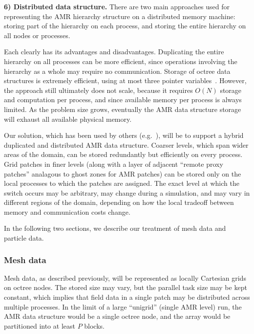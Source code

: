 \documentclass[10pt,twocolumn]{article}
\begin{document}

\textbf{6) Distributed data structure.} There are two main approaches
used for representing the AMR hierarchy structure on a distributed
memory machine: storing part of the hierarchy on each process, and
storing the entire hierarchy on all nodes or processes.

Each clearly has its advantages and disadvantages.  Duplicating the
entire hierarchy on all processes can be more efficient, since
operations involving the hierarchy as a whole may require no
communication.  Storage of octree data structures is extremely
efficient, using at most three pointer variables~\cite{FrPe02}.  However,
the approach still ultimately does not scale, because it requires
$O(N)$ storage and computation per process, and since available memory
per process is always limited.  As the problem size grows, eventually
the AMR data structure storage will exhaust all available physical
memory.

Our solution, which has been used by others
(e.g.~\cite{@@@hybrid-storage}), will be to support a hybrid
duplicated and distributed AMR data structure.  Coarser levels, which
span wider areas of the domain, can be stored redundantly but
efficiently on every process.  Grid patches in finer levels (along
with a layer of adjacent ``remote proxy patches'' analagous to ghost
zones for AMR patches) can be stored only on the local processes to
which the patches are assigned.  The exact level at which the switch
occurs may be arbitrary, may change during a simulation, and may vary
in different regions of the domain, depending on how the local tradeoff
between memory and communication costs change.

In the following two sections, we describe our treatment of mesh data
and particle data.

\subsubsection{Mesh data} \label{sss:design-fields}

Mesh data, as described previously, will be represented as locally
Cartesian grids on octree nodes.  The stored size may vary, but the
parallel task size may be kept constant, which implies that field data
in a single patch may be distributed across multiple processes.  In
the limit of a large ``unigrid'' (single AMR level) run, the AMR data
structure would be a single octree node, and the array would be
partitioned into at least $P$ blocks.
\end{document}
